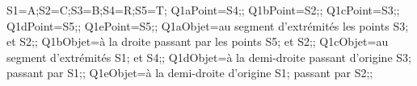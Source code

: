 \documentclass[exercice]{thedocument}%
\begin{document}
%
    \>S1=A;\>S2=C;\>S3=B;\>S4=R;\>S5=T;%
    \>Q1aPoint={\<S4;};%
    \>Q1bPoint={\<S2;};%
    \>Q1cPoint={\<S3;};%
    \>Q1dPoint={\<S5;};%
    \>Q1ePoint={\<S5;};%
    \>Q1aObjet={au segment d'extrémités les points \<S3; et \<S2;};%
    \>Q1bObjet={à la droite passant par les points \<S5; et \<S2;};%
    \>Q1cObjet={au segment d'extrémités \<S1; et \<S4;};%
    \>Q1dObjet={à la demi-droite passant d'origine \<S3; passant par \<S1;};%
    \>Q1eObjet={à la demi-droite d'origine \<S1; passant par \<S2;};%
\end{document}
